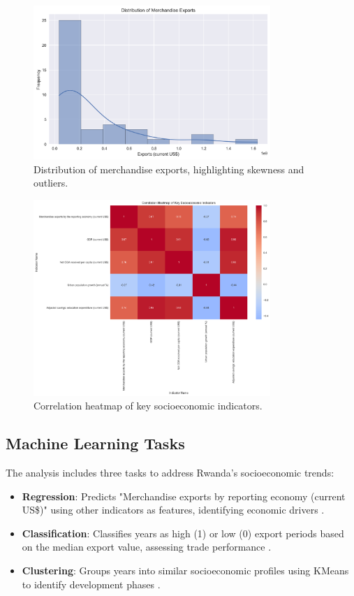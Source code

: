 \documentclass[12pt]{article}
\begin{document}
	\begin{figure}[H]
		\centering
		\includegraphics[width=0.8\textwidth]{../distribution.png}
		\caption{Distribution of merchandise exports, highlighting skewness and outliers.}
		\label{fig:distribution}
	\end{figure}
	
	\begin{figure}[H]
		\centering
		\includegraphics[width=0.8\textwidth]{../heatmap.png}
		\caption{Correlation heatmap of key socioeconomic indicators.}
		\label{fig:heatmap}
	\end{figure}
	
	\subsection{Machine Learning Tasks}
	The analysis includes three tasks to address Rwanda's socioeconomic trends:
	\begin{itemize}
		\item \textbf{Regression}: Predicts "Merchandise exports by reporting economy (current US\$)" using other indicators as features, identifying economic drivers \citep{hastie}.
		\item \textbf{Classification}: Classifies years as high (1) or low (0) export periods based on the median export value, assessing trade performance \citep{geron}.
		\item \textbf{Clustering}: Groups years into similar socioeconomic profiles using KMeans to identify development phases \citep{scikit-learn}.
	\end{itemize}
	
\end{document}
